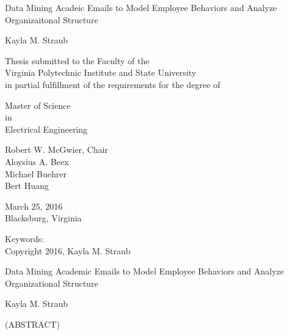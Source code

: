 \documentclass[12pt,dvips]{report}
\begin{document}
\thispagestyle{empty}
\begin{center}

{\Large 
Data Mining Acadeic Emails to Model Employee Behaviors and Analyze Organizaitonal Structure
}

\vfill

Kayla M. Straub

\vfill

Thesis submitted to the Faculty of the \\
Virginia Polytechnic Institute and State University \\
in partial fulfillment of the requirements for the degree of

\vfill

Master of Science \\
in \\
Electrical Engineering
\vfill

Robert W. McGwier, Chair \\
Aloysius A. Beex\\
Michael Buehrer\\
Bert Huang

\vfill

March 25, 2016 \\
Blacksburg, Virginia

\vfill

Keywords: 
\\
Copyright 2016, Kayla M. Straub

\end{center}

\pagebreak

\thispagestyle{empty}
\begin{center}

{\large Data Mining Academic Emails to Model Employee Behaviors and Analyze Organizational Structure}

\vfill

Kayla M. Straub

\vfill

(ABSTRACT)

\vfill

\end{center}
\end{document}
